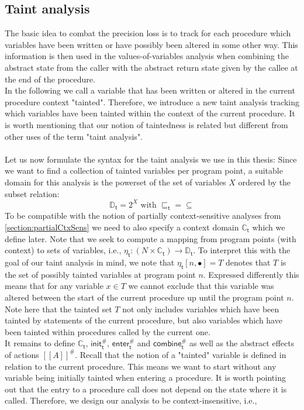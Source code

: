    \subsection{Taint analysis}\label{section:formalTaint}
      The basic idea to combat the precision loss is to track for each procedure which variables have been written or have possibly been altered in some other way. This information is then used in the values-of-variables analysis when combining the abstract state from the caller with the abstract return state given by the callee at the end of the procedure.\\
      In the following we call a variable that has been written or altered in the current procedure context "tainted". Therefore, we introduce a new taint analysis tracking which variables have been tainted within the context of the current procedure. It is worth mentioning that our notion of taintedness is related but different from other uses of the term "taint analysis".\\
      \\
      Let us now formulate the syntax for the taint analysis we use in this thesis: Since we want to find a collection of tainted variables per program point, a suitable domain for this analysis is the powerset of the set of variables $X$ ordered by the subset relation:
      \[\mathbb{D}_\textsf{t} = 2^X \text{ with } \sqsubseteq_\textsf{t} = \subseteq\]
      To be compatible with the notion of partially context-sensitive analyses from \autoref{section:partialCtxSens} we need to also specify a context domain $\mathbb{C}_\textsf{t}$ which we define later.
      Note that we seek to compute a mapping from program points (with context) to sets of variables, i.e., $\eta_\textsf{t}: (N \times \mathbb{C}_\textsf{t}) \rightarrow \mathbb{D}_\textsf{t}$. To interpret this with the goal of our taint analysis in mind, we note that $\eta_\textsf{t} [n, \bullet] = T$ denotes that $T$ is the set of possibly tainted variables at program point $n$. Expressed differently this means that for any variable $x \in T$ we cannot exclude that this variable was altered between the start of the current procedure up until the program point $n$. Note here that the tainted set $T$ not only includes variables which have been tainted by statements of the current procedure, but also variables which have been tainted within procedures called by the current one.\\
      It remains to define $\mathbb{C}_\textsf{t}$, $\textsf{init}^{\#}_\textsf{t}$, $\textsf{enter}^{\#}_\textsf{t}$ and $\textsf{combine}^{\#}_\textsf{t}$ as well as the abstract effects of actions $[\![ A ]\!]^{\#}$. Recall that the notion of a "tainted" variable is defined in relation to the current procedure. This means we want to start without any variable being initially tainted when entering a procedure. It is worth pointing out that the entry to a procedure call does not depend on the state where it is called. Therefore, we design our analysis to be context-insensitive, i.e., 
